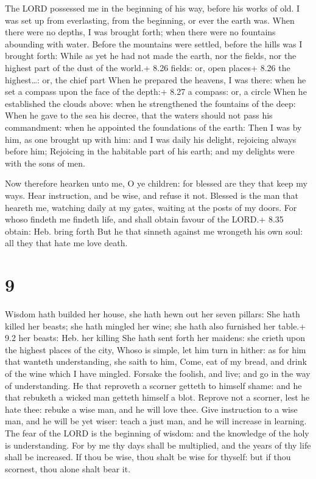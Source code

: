 The LORD possessed me in the beginning of his way, before
his works of old.  I was set up from everlasting, from the
beginning, or ever the earth was.  When there were no
depths, I was brought forth; when there were no fountains abounding with
water.  Before the mountains were settled, before the hills
was I brought forth:  While as yet he had not made the
earth, nor the fields, nor the highest part of the dust of the world.+
8.26 fields: or, open places+ 8.26 the highest\ldots: or, the chief part
 When he prepared the heavens, I was there: when he set a
compass upon the face of the depth:+ 8.27 a compass: or, a circle
 When he established the clouds above: when he strengthened
the fountains of the deep:  When he gave to the sea his
decree, that the waters should not pass his commandment: when he
appointed the foundations of the earth:  Then I was by him,
as one brought up with him: and I was daily his delight, rejoicing
always before him;  Rejoicing in the habitable part of his
earth; and my delights were with the sons of men.

 Now therefore hearken unto me, O ye children: for blessed
are they that keep my ways.  Hear instruction, and be wise,
and refuse it not.  Blessed is the man that heareth me,
watching daily at my gates, waiting at the posts of my doors.
 For whoso findeth me findeth life, and shall obtain favour
of the LORD.+ 8.35 obtain: Heb. bring forth  But he that
sinneth against me wrongeth his own soul: all they that hate me love
death.

\hypertarget{section-8}{%
\section{9}\label{section-8}}

 Wisdom hath builded her house, she hath hewn out her seven
pillars:  She hath killed her beasts; she hath mingled her
wine; she hath also furnished her table.+ 9.2 her beasts: Heb. her
killing  She hath sent forth her maidens: she crieth upon
the highest places of the city,  Whoso is simple, let him
turn in hither: as for him that wanteth understanding, she saith to him,
 Come, eat of my bread, and drink of the wine which I have
mingled.  Forsake the foolish, and live; and go in the way
of understanding.  He that reproveth a scorner getteth to
himself shame: and he that rebuketh a wicked man getteth himself a blot.
 Reprove not a scorner, lest he hate thee: rebuke a wise
man, and he will love thee.  Give instruction to a wise man,
and he will be yet wiser: teach a just man, and he will increase in
learning.  The fear of the LORD is the beginning of wisdom:
and the knowledge of the holy is understanding.  For by me
thy days shall be multiplied, and the years of thy life shall be
increased.  If thou be wise, thou shalt be wise for
thyself: but if thou scornest, thou alone shalt bear it.

